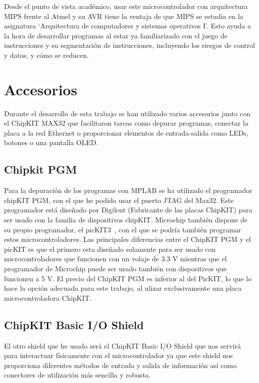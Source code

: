 Desde el punto de vista académico, usar este microcontrolador con arquitectura MIPS frente al Atmel y su AVR tiene la ventaja de que MIPS se estudia en la asignatura `Arquitectura de computadores y sistemas operativos I'. Esto ayuda a la hora de desarrollar programas al estar ya familiarizado con el juego de instrucciones y su segmentación de instrucciones, incluyendo los riesgos de control y datos, y cómo se reducen.

\section{Accesorios}
Durante el desarrollo de esta trabajo se han utilizado varios accesorios junto con el ChipKIT MAX32 que facilitaron tareas como depurar programas, conectar la placa a la red Ethernet o proporcionar elementos de entrada-salida como LEDs, botones o una pantalla OLED.\@
\subsection{Chipkit PGM}
Para la depuración de los programas con MPLAB se ha utilizado el programador chipKIT PGM\cite{website:pgm}, con el que he podido usar el puerto JTAG del Max32. Este programador está diseñado por Digilent (Fabricante de las placas ChipKIT) para ser usado con la familia de dispositivos chipKIT. Microchip también dispone de su propio programador, el picKIT3~\cite{website:pickit}, con el que se podría también programar estos microcontroladores. Las principales diferencias entre el ChipKIT PGM y el picKIT es que el primero esta diseñado solamente para ser usado con microcontroladores que funcionen con un volaje de 3.3 V mientras que el programador de Microchip puede ser usado también con dispositivos que funcionen a 5 V. El precio del ChipKIT PGM es inferior al del PicKIT, lo que lo hace la opción adecuada para este trabajo, al ulizar exclusivamente una placa microcontroladora ChipKIT.


\subsection{ChipKIT Basic I/O Shield}
El otro shield que he usado será el ChipKIT Basic I/O Shield que nos servirá para interactuar físicamente con el microcontrolador ya que este shield nos proporciona diferentes métodos de entrada y salida de información así como conectores de utilización más sencilla y robusta.

